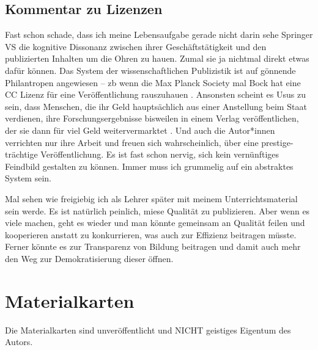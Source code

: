 \subsection{Kommentar zu Lizenzen}
Fast schon schade, dass ich meine Lebensaufgabe gerade nicht darin sehe Springer VS die kognitive Dissonanz zwischen ihrer Geschäftstätigkeit und den publizierten Inhalten um die Ohren zu hauen. Zumal sie ja nichtmal direkt etwas dafür können. Das System der wissenschaftlichen Publizistik ist auf gönnende Philantropen angewiesen -- \Gls{zb} wenn die Max Planck Society mal Bock hat eine CC Lizenz für eine Veröffentlichung rauszuhauen \autocite[Beispiel von hier:][178, übrigens ohne SA, damit auch die kommerzielle Publizistik Spaß damit haben kann]{Elsasser.2017}. Ansonsten scheint es Usus zu sein, dass Menschen, die ihr Geld hauptsächlich aus einer Anstellung beim Staat verdienen, ihre Forschungsergebnisse bisweilen in einem Verlag veröffentlichen, der sie dann für viel Geld weitervermarktet \autocite[schade, dass sich das wahrscheinlich niemand anschauen wird, der nicht über den akademischen Bereich \gls{oä} Zugang hat. Ist spannend, aber Paywall ftw (e-book {66,99€} am 12.06.2025)]{Schroder.2020}. Und auch die Autor*innen verrichten nur ihre Arbeit und freuen sich wahrscheinlich, über eine prestige-trächtige Veröffentlichung. Es ist fast schon nervig, sich kein vernünftiges Feindbild gestalten zu können. %
Immer muss ich grummelig auf ein abstraktes System sein. 

Mal sehen wie freigiebig ich als Lehrer später mit meinem Unterrichtsmaterial sein werde. Es ist natürlich peinlich, miese Qualität zu publizieren. Aber wenn es viele machen, geht es wieder und man könnte gemeinsam an Qualität feilen und kooperieren anstatt zu konkurrieren, was auch zur Effizienz beitragen müsste. Ferner könnte es zur Transparenz von Bildung beitragen und damit auch mehr den Weg zur Demokratisierung dieser öffnen. 


\section{Materialkarten}
Die Materialkarten sind unveröffentlicht und NICHT geistiges Eigentum des Autors. 

\clearpage
\newpage

